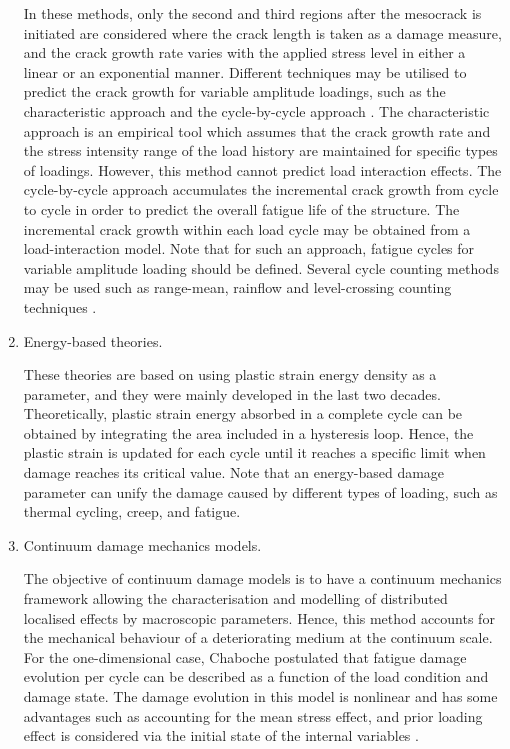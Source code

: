 \begin{enumerate}
	      In these methods, only the second and third regions after the mesocrack is initiated are considered where the crack length is taken as a damage measure, and the crack growth rate varies with the applied stress level in either a linear or an exponential manner. Different techniques may be utilised to predict the crack growth for variable amplitude loadings, such as the characteristic approach and the cycle-by-cycle approach \parencite{fleck1984fatigue}. The characteristic approach is an empirical tool which assumes that the crack growth rate and the stress intensity range of the load history are maintained for specific types of loadings. However, this method cannot predict load interaction effects. The cycle-by-cycle approach accumulates the incremental crack growth from cycle to cycle in order to predict the overall fatigue life of the structure. The incremental crack growth within each load cycle may be obtained from a load-interaction model. Note that for such an approach, fatigue cycles for variable amplitude loading should be defined. Several cycle counting methods may be used such as range-mean, rainflow and level-crossing counting techniques \parencite{fleck1984fatigue}.

	\item Energy-based theories.

	      These theories are based on using plastic strain energy density as a parameter, and they were mainly developed in the last two decades. Theoretically, plastic strain energy absorbed in a complete cycle can be obtained by integrating the area included in a hysteresis loop. Hence, the plastic strain is updated for each cycle until it reaches a specific limit when damage reaches its critical value. Note that an energy-based damage parameter can unify the damage caused by different types of loading, such as thermal cycling, creep, and fatigue.

	\item Continuum damage mechanics models.

	      The objective of continuum damage models is to have a continuum mechanics framework allowing the characterisation and modelling of distributed localised effects by macroscopic parameters. Hence, this method accounts for the mechanical behaviour of a deteriorating medium at the continuum scale. For the one-dimensional case, Chaboche postulated that fatigue damage evolution per cycle can be described as a function of the load condition and damage state. The damage evolution in this model is nonlinear and has some advantages such as accounting for the mean stress effect, and prior loading effect is considered via the initial state of the internal variables \parencite{fatemi1998cumulative}.
\end{enumerate}

